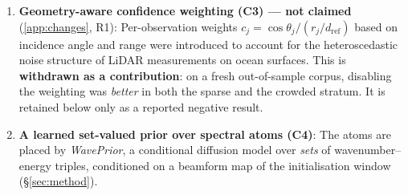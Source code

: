 \documentclass[review]{elsarticle}
\begin{document}
\begin{enumerate}
    constraint, and a controlled intervention that isolates the constraint
    was null in both strata.
  \item \textbf{Geometry-aware confidence weighting (C3) --- not claimed}
    (\ref{app:changes}, R1): Per-observation weights
    $c_j = \cos\theta_j/(r_j/d_{\text{ref}})$ based on incidence angle and
    range were introduced to account for the heteroscedastic noise structure
    of LiDAR measurements on ocean surfaces. This is \textbf{withdrawn as a
    contribution}: on a fresh out-of-sample corpus, disabling the weighting
    was \emph{better} in both the sparse and the crowded stratum.
    It is retained below only as a reported negative result.
  \item \textbf{A learned set-valued prior over spectral atoms (C4)}: The atoms are
    placed by \emph{WavePrior}, a conditional diffusion model over \emph{sets} of
    wavenumber--energy triples, conditioned on a beamform map of the
    initialisation window (\S\ref{sec:method}).

\end{enumerate}
\end{document}

